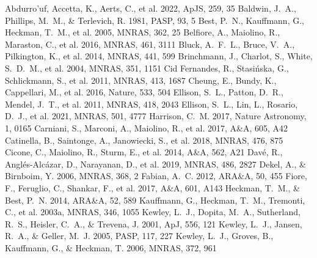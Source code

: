 \documentclass[twocolumn]{aastex631}
\begin{document}
\begin{thebibliography}{}
 Abdurro'uf, Accetta, K., Aerts, C., et al. 2022, ApJS, 259, 35
 Baldwin, J.~A., Phillips, M.~M., \& Terlevich, R. 1981, PASP, 93, 5
 Best, P.~N., Kauffmann, G., Heckman, T.~M., et al. 2005, MNRAS, 362, 25
 Belfiore, A., Maiolino, R., Maraston, C., et al. 2016, MNRAS, 461, 3111
 Bluck, A.~F.~L., Bruce, V.~A., Pilkington, K., et al. 2014, MNRAS, 441, 599
 Brinchmann, J., Charlot, S., White, S.~D.~M., et al. 2004, MNRAS, 351, 1151
 Cid Fernandes, R., Stasi{\'n}ska, G., Schlickmann, S., et al. 2011, MNRAS, 413, 1687
 Cheung, E., Bundy, K., Cappellari, M., et al. 2016, Nature, 533, 504
 Ellison, S.~L., Patton, D.~R., Mendel, J.~T., et al. 2011, MNRAS, 418, 2043
 Ellison, S.~L., Lin, L., Rosario, D.~J., et al. 2021, MNRAS, 501, 4777
 Harrison, C.~M. 2017, Nature Astronomy, 1, 0165
 Carniani, S., Marconi, A., Maiolino, R., et al. 2017, A\&A, 605, A42
 Catinella, B., Saintonge, A., Janowiecki, S., et al. 2018, MNRAS, 476, 875
 Cicone, C., Maiolino, R., Sturm, E., et al. 2014, A\&A, 562, A21
 Dav{\'e}, R., Angl{\'e}s-Alc{\'a}zar, D., Narayanan, D., et al. 2019, MNRAS, 486, 2827
 Dekel, A., \& Birnboim, Y. 2006, MNRAS, 368, 2
 Fabian, A.~C. 2012, ARA\&A, 50, 455
 Fiore, F., Feruglio, C., Shankar, F., et al. 2017, A\&A, 601, A143
 Heckman, T.~M., \& Best, P.~N. 2014, ARA\&A, 52, 589
 Kauffmann, G., Heckman, T.~M., Tremonti, C., et al. 2003a, MNRAS, 346, 1055
 Kewley, L.~J., Dopita, M.~A., Sutherland, R.~S., Heisler, C.~A., \& Trevena, J. 2001, ApJ, 556, 121
 Kewley, L.~J., Jansen, R.~A., \& Geller, M.~J. 2005, PASP, 117, 227
 Kewley, L.~J., Groves, B., Kauffmann, G., \& Heckman, T. 2006, MNRAS, 372, 961

\end{thebibliography}
\end{document}
